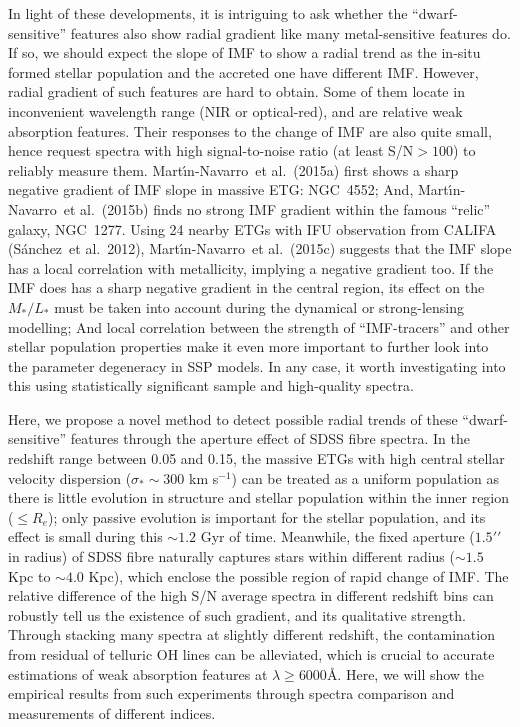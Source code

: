 \documentclass[preprint]{aastex}
\def\arcsec{{\prime\prime}}
\def\etal{{\ et al.~}}
\def\kms{km s$^{-1}$}
\def\m2l{$M_{\ast}/L_{\ast}$}
\begin{document}
\begin{CJK*}{UTF8}{gbsn}
  In light of these developments, it is intriguing to ask whether the
  ``dwarf-sensitive'' features also show radial gradient like many 
  metal-sensitive features do.  If so, we should expect the slope of 
  IMF to show a radial trend as the in-situ formed stellar population 
  and the accreted one have different IMF.  However, radial gradient 
  of such features are hard to obtain.  Some of them locate in inconvenient
  wavelength range (NIR or optical-red), and are relative weak absorption
  features.  Their responses to the change of IMF are also quite small, 
  hence request spectra with high signal-to-noise ratio (at least 
  S/N$>100$) to reliably measure them.  Mart{\'{\i}}n-Navarro\etal (2015a)
  first shows a sharp negative gradient of IMF slope in massive ETG: 
  NGC~4552; And, Mart{\'{\i}}n-Navarro\etal (2015b) finds no strong 
  IMF gradient within the famous ``relic'' galaxy, NGC~1277.  Using 24 
  nearby ETGs with IFU observation from CALIFA (S{\'a}nchez\etal 2012), 
  Mart{\'{\i}}n-Navarro\etal (2015c) suggests that the IMF slope has 
  a local correlation with metallicity, implying a negative gradient 
  too.  If the IMF does has a sharp negative gradient in the central region, 
  its effect on the \m2l must be taken into account during 
  the dynamical or strong-lensing modelling; And local correlation between 
  the strength of ``IMF-tracers'' and other stellar population properties 
  make it even more important to further look into the parameter degeneracy 
  in SSP models.  In any case, it worth investigating into this using 
  statistically significant sample and high-quality spectra. 
    
  Here, we propose a novel method to detect possible radial trends of 
  these ``dwarf-sensitive'' features through the aperture effect of 
  SDSS fibre spectra.  In the redshift range between 0.05 and 0.15, 
  the massive ETGs with high central stellar velocity dispersion 
  (${\sigma}_{\ast} \sim 300$ \kms) can be treated as a uniform population 
  as there is little evolution in structure and stellar population 
  within the inner region ($\leq R_e$); only passive evolution is important 
  for the stellar population, and its effect is small during this $\sim 1.2$ 
  Gyr of time.  Meanwhile, the fixed aperture ($1.5\arcsec$ in 
  radius) of SDSS fibre naturally captures stars within different radius 
  ($\sim 1.5$ Kpc to $\sim 4.0$ Kpc), which enclose the possible region of 
  rapid change of IMF.  The relative difference of the high S/N average 
  spectra in different redshift bins can robustly tell us the existence 
  of such gradient, and its qualitative strength.  Through stacking many 
  spectra at slightly different redshift, the contamination from residual 
  of telluric OH lines can be alleviated, which is crucial to accurate 
  estimations of weak absorption features at $\lambda \ge 6000$\AA.  Here, 
  we will show the empirical results from such experiments through spectra 
  comparison and measurements of different indices.  
  

\end{CJK*}
\end{document}
